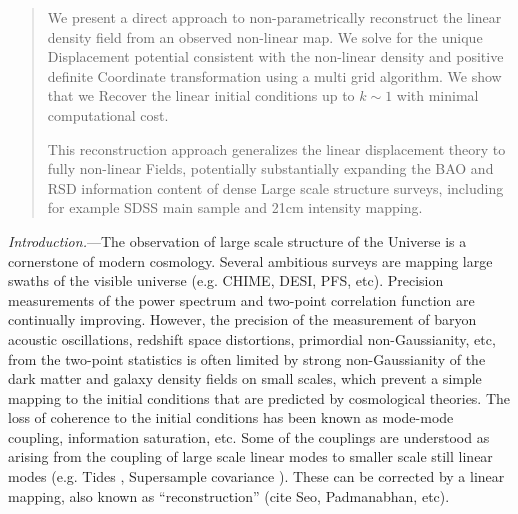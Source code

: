 \documentclass[aps,prd,twocolumn,superscriptaddress,groupedaddress,nofootinbib]{revtex4}  %
\begin{document}
\begin{abstract}
We present a direct approach to non-parametrically reconstruct the linear
density field from an observed non-linear map.  We solve for the unique 
Displacement potential consistent with the non-linear density and positive definite 
Coordinate transformation using a multi grid algorithm.  We show that we
Recover the linear initial conditions up to $k\sim 1$ with minimal computational cost.

This reconstruction approach generalizes the linear displacement theory to fully non-linear
Fields, potentially substantially expanding the BAO and RSD information content of dense 
Large scale structure surveys, including for example SDSS main sample and 21cm intensity mapping.

\end{abstract}

\pacs{}
\maketitle


{\it Introduction.}---The observation of large scale structure of the 
Universe is a cornerstone of modern cosmology.  
Several ambitious surveys are mapping large swaths of the
visible universe (e.g. CHIME, DESI, PFS, etc).  
Precision measurements of the power spectrum and two-point correlation 
function are continually improving.
However, the precision of the measurement of baryon acoustic oscillations, 
redshift space distortions, primordial non-Gaussianity, etc,
from the two-point statistics is often limited by strong non-Gaussianity
of the dark matter and galaxy density fields on small scales, which prevent 
a simple mapping to the
initial conditions that are predicted by cosmological theories.  The
loss of coherence to the initial conditions has been known as
mode-mode coupling, information saturation, etc.
Some of the couplings are understood as arising from the coupling of
large scale linear modes to smaller scale still linear modes
(e.g. Tides \cite{2012tides1,2016tides2}, Supersample covariance \cite{2014sc3}).  These can be corrected by a
linear mapping, also known as ``reconstruction'' \cite{2007bao}(cite Seo, Padmanabhan,
etc).
\end{document}
